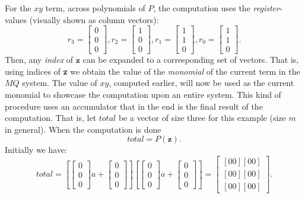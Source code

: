 For the $xy$ term, across polynomials of $P$, the computation uses the \emph{register}-values (visually shown as column vectors):
$$
    r_3 = \begin{bmatrix} 0\\ 0\\ 0 \end{bmatrix}, r_2 = \begin{bmatrix} 1\\ 0\\ 0 \end{bmatrix}, r_1 = \begin{bmatrix} 1\\ 1\\ 0 \end{bmatrix}, r_0 = \begin{bmatrix} 1\\ 1\\ 0 \end{bmatrix}.
$$
Then, any \emph{index} of $\textbf{z}$ can be expanded to a corresponding set of vectors. That is, using indices of \textbf{z} we obtain the value of the \emph{monomial} of the current term in the $MQ$ system. The value of $xy$, computed earlier, will now be used as the current monomial to showcase the computation upon an entire system. This kind of procedure uses an accumulator that in the end is the final result of the computation. That is, let $total$ be a vector of size three for this example (size $m$ in general). When the computation is done
$$
    total = P(\textbf{z}).
$$
Initially we have:
$$
    total = 
    [
    \begin{bmatrix}
        0\\
        0\\
        0
    \end{bmatrix}a
    + 
    \begin{bmatrix}
        0\\
        0\\
        0
    \end{bmatrix} ]
    [
    \begin{bmatrix}
        0\\
        0\\
        0
    \end{bmatrix}a
    + 
    \begin{bmatrix}
        0\\
        0\\
        0
    \end{bmatrix} 
    ] = \begin{bmatrix}
        [00][00]\\
        [00][00]\\
        [00][00]
    \end{bmatrix}.
$$
